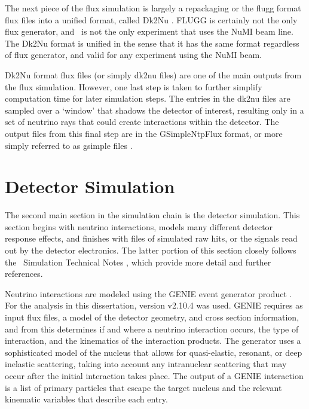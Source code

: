 The next piece of the flux simulation is largely a repackaging or the flugg format flux files into a unified format, called Dk2Nu \cite{ref:Dk2Nu}. FLUGG is certainly not the only flux generator, and \nova~is not the only experiment that uses the NuMI beam line. The Dk2Nu format is unified in the sense that it has the same format regardless of flux generator, and valid for any experiment using the NuMI beam.

Dk2Nu format flux files (or simply dk2nu files) are one of the main outputs from the flux simulation. However, one last step is taken to further simplify computation time for later simulation steps. The entries in the dk2nu files are sampled over a `window' that shadows the detector of interest, resulting only in a set of neutrino rays that could create interactions within the detector. The output files from this final step are in the GSimpleNtpFlux format, or more simply referred to as gsimple files \cite{ref:gsimple}.

\section{Detector Simulation}
\label{sec:SimDet}

The second main section in the simulation chain is the detector simulation. This section begins with neutrino interactions, models many different detector response effects, and finishes with files of simulated raw hits, or the signals read out by the detector electronics. The latter portion of this section closely follows the \nova~Simulation Technical Notes \cite{ref:TNDetSimFA ref:TNDetSimSA}, which provide more detail and further references.


Neutrino interactions are modeled using the GENIE event generator product \cite{ref:GENIEGen, ref:GENIE}. For the analysis in this dissertation, version v2.10.4 was used. GENIE requires as input flux files, a model of the detector geometry, and cross section information, and from this determines if and where a neutrino interaction occurs, the type of interaction, and the kinematics of the interaction products. The generator uses a sophisticated model of the nucleus that allows for quasi-elastic, resonant, or deep inelastic scattering, taking into account any intranuclear scattering that may occur after the initial interaction takes place. The output of a GENIE interaction is a list of primary particles that escape the target nucleus and the relevant kinematic variables that describe each entry.

